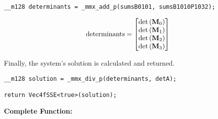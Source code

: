 \begin{verbatim}
__m128 determinants = _mmx_add_p(sumsB0101, sumsB1010P1032);
\end{verbatim}


\begin{align*}
\mathrm{determinants} 
=
\begin{bmatrix}
\mathrm{det}\left(\mathbf{M}_0\right)\\
\mathrm{det}\left(\mathbf{M}_1\right)\\
\mathrm{det}\left(\mathbf{M}_2\right)\\
\mathrm{det}\left(\mathbf{M}_3\right)\\
\end{bmatrix}
\end{align*}

Finally, the system's solution is calculated and returned.

\begin{verbatim}
__m128 solution = _mmx_div_p(determinants, detA);

return Vec4fSSE<true>(solution);
\end{verbatim}


\vspace{1cm}
\textbf{Complete Function:}

